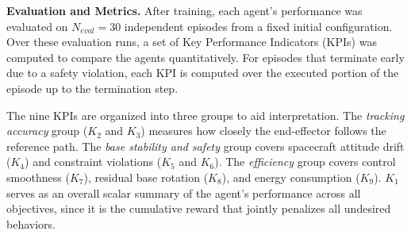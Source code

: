 \documentclass{ieeeaccess}
\begin{document}
\textbf{Evaluation and Metrics.} After training, each agent's performance was evaluated on $N_{eval}
= 30$ independent episodes from a fixed initial configuration. Over these
evaluation runs, a set of Key Performance Indicators (KPIs) was computed to compare the
agents quantitatively. For episodes that terminate early due to a safety violation, each KPI
is computed over the executed portion of the episode up to the termination step.

The nine KPIs are organized into three groups to aid interpretation. The \emph{tracking accuracy}
group ($K_2$ and $K_3$) measures how closely the end-effector follows the reference path. The
\emph{base stability and safety} group covers spacecraft attitude drift ($K_4$) and constraint violations ($K_5$
and $K_6$). The \emph{efficiency} group covers control smoothness ($K_7$), residual base rotation ($K_8$), and
energy consumption ($K_9$). $K_1$ serves as an overall scalar summary of the agent's performance
across all objectives, since it is the cumulative reward that jointly penalizes all undesired
behaviors.
\end{document}
